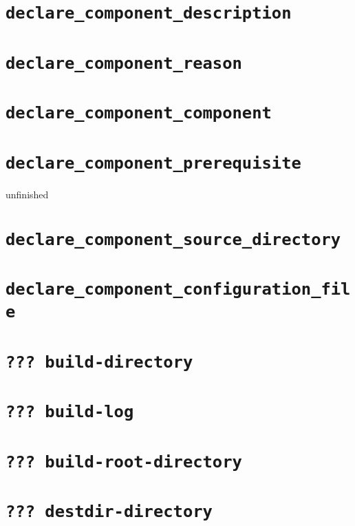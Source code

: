\section{\texttt{declare\_component\_description}}\label{api:description}

\section{\texttt{declare\_component\_reason}}\label{api:reason}

\section{\texttt{declare\_component\_component}}\label{api:component}

\section{\texttt{declare\_component\_prerequisite}}\label{api:prerequisite}

unfinished

\section{\texttt{declare\_component\_source\_directory}}\label{api:source-directory}

\section{\texttt{declare\_component\_configuration\_file}}\label{api:configuration-file}

\section{\texttt{??? build-directory}}\label{api:build-directory}

\section{\texttt{??? build-log}}\label{api:build-log}

\section{\texttt{??? build-root-directory}}\label{api:build-root-directory}

\section{\texttt{??? destdir-directory}}\label{api:destdir-directory}

